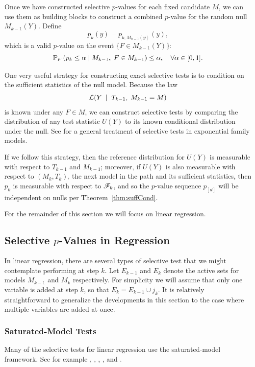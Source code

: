 \documentclass{article}
\begin{document}
Once we have constructed selective $p$-values for each fixed candidate $M$, we can use them as building blocks to construct a combined $p$-value for the random null $M_{k-1}(Y)$. Define
\[
p_k(y) = p_{k, M_{k-1}(y)}(y),
\]
which is a valid $p$-value on the event $\{F \in M_{k-1}(Y)\}$:
\begin{equation}\label{eq:selectiveGuaranteePk}
\P_F\left(p_k \leq \alpha \mid M_{k-1}, 
  \;F\in M_{k-1}\right) \leq \alpha, \quad \forall \alpha \in [0,1].
\end{equation}

One very useful strategy for constructing exact selective tests is to condition on the sufficient statistics of the null model. Because the law
\[
\L(Y \;\mid\; T_{k-1}, \; M_{k-1}=M)
\]
is known under any $F\in M$, we can construct selective tests by comparing the distribution of any test statistic $U(Y)$ to its known conditional distribution under the null. See \citet{fithian2014optimal} for a general treatment of selective tests in exponential family models.

If we follow this strategy, then the reference distribution for $U(Y)$ is measurable with respect to $T_{k-1}$ and $M_{k-1}$; moreover, if $U(Y)$ is also measurable with respect to $(M_k, T_k)$, the next model in the path and its sufficient statistics, then $p_k$ is measurable with respect to $\sF_k$, and so the $p$-value sequence $p_{[d]}$ will be independent on nulls per Theorem~\ref{thm:suffCond}.

For the remainder of this section we will focus on linear regression.

\subsection{Selective $p$-Values in Regression}
\label{sec:selective-reg}
In linear regression, there are several types of selective test that we might contemplate performing at step $k$. Let $E_{k-1}$ and $E_k$ denote the active sets for models $M_{k-1}$ and $M_k$ respectively. For simplicity we will assume that only one variable is added at step $k$, so that $E_k = E_{k-1} \cup j_k$. It is relatively straightforward to generalize the developments in this section to the case where multiple variables are added at once.

\subsubsection{Saturated-Model Tests}
Many of the selective tests for linear regression use the saturated-model framework. See for example \citet{lockhart2014significance}, \citet{taylor2013tests}, \citet{taylor2014exact}, \citet{lee2013exact}, and \citet{loftus2014significance}.
\end{document}
